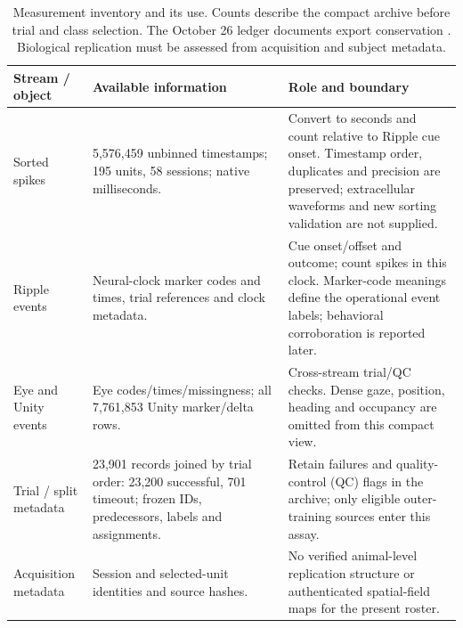\documentclass[10pt,a4paper]{article}
\begin{document}
\begin{table}[h!]
\caption{Measurement inventory and its use. Counts describe the compact archive before trial and class selection. The October 26 ledger documents export conservation \cite{compact}. Biological replication must be assessed from acquisition and subject metadata.}
\label{tab:inventory}\small
\begin{tabularx}{\linewidth}{L{29mm}L{44mm}Y}
\toprule
Stream / object & Available information & Role and boundary \\
\midrule
Sorted spikes & 5,576,459 unbinned timestamps; 195 units, 58 sessions; native milliseconds. & Convert to seconds and count relative to Ripple cue onset. Timestamp order, duplicates and precision are preserved; extracellular waveforms and new sorting validation are not supplied. \\
Ripple events & Neural-clock marker codes and times, trial references and clock metadata. & Cue onset/offset and outcome; count spikes in this clock. Marker-code meanings define the operational event labels; behavioral corroboration is reported later. \\
Eye and Unity events & Eye codes/times/missingness; all 7,761,853 Unity marker/delta rows. & Cross-stream trial/QC checks. Dense gaze, position, heading and occupancy are omitted from this compact view. \\
Trial / split metadata & 23,901 records joined by trial order: 23,200 successful, 701 timeout; frozen IDs, predecessors, labels and assignments. & Retain failures and quality-control (QC) flags in the archive; only eligible outer-training sources enter this assay. \\
Acquisition metadata & Session and selected-unit identities and source hashes. & No verified animal-level replication structure or authenticated spatial-field maps for the present roster. \\
\bottomrule
\end{tabularx}
\end{table}
\end{document}
